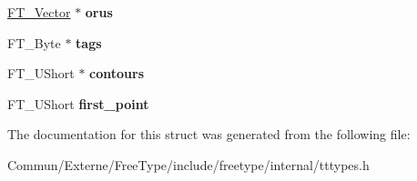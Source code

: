 \begin{DoxyCompactItemize}
\item 
\hyperlink{struct_f_t___vector__}{F\+T\+\_\+\+Vector} $\ast$ {\bfseries orus}\hypertarget{struct_t_t___glyph_zone_rec___a4b4193dbae177435cb6515f9a0537fa0}{}\label{struct_t_t___glyph_zone_rec___a4b4193dbae177435cb6515f9a0537fa0}

\item 
F\+T\+\_\+\+Byte $\ast$ {\bfseries tags}\hypertarget{struct_t_t___glyph_zone_rec___ae816c5c1096e333741d3f3f9d3ae0a8f}{}\label{struct_t_t___glyph_zone_rec___ae816c5c1096e333741d3f3f9d3ae0a8f}

\item 
F\+T\+\_\+\+U\+Short $\ast$ {\bfseries contours}\hypertarget{struct_t_t___glyph_zone_rec___ad16498cac0d4d233dce009eb74d63de1}{}\label{struct_t_t___glyph_zone_rec___ad16498cac0d4d233dce009eb74d63de1}

\item 
F\+T\+\_\+\+U\+Short {\bfseries first\+\_\+point}\hypertarget{struct_t_t___glyph_zone_rec___a9d655be80b3e31652f69ede54458faaf}{}\label{struct_t_t___glyph_zone_rec___a9d655be80b3e31652f69ede54458faaf}

\end{DoxyCompactItemize}


The documentation for this struct was generated from the following file\+:\begin{DoxyCompactItemize}
\item 
Commun/\+Externe/\+Free\+Type/include/freetype/internal/tttypes.\+h\end{DoxyCompactItemize}
